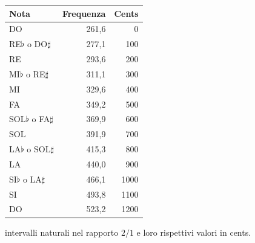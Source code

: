 \begin{center}
\renewcommand{\arraystretch}{1.1}
\begin{tabular}{lrr}
  \toprule
  \textbf{Nota} & \textbf{Frequenza} & \textbf{Cents} \\
  \midrule
  DO                       & 261,6 & 0 \\
  RE$\flat$ o DO$\sharp$   & 277,1 & 100 \\
  RE                       & 293,6 & 200 \\
  MI$\flat$ o RE$\sharp$   & 311,1 & 300 \\
  MI                       & 329,6 & 400 \\
  FA                       & 349,2 & 500 \\
  SOL$\flat$ o FA$\sharp$  & 369,9 & 600 \\
  SOL                      & 391,9 & 700 \\
  LA$\flat$ o SOL$\sharp$  & 415,3 & 800 \\
  LA                       & 440,0 & 900 \\
  SI$\flat$ o LA$\sharp$   & 466,1 & 1000 \\
  SI                       & 493,8 & 1100 \\
  DO                       & 523,2 & 1200 \\
  \bottomrule
\end{tabular}
\end{center}


 intervalli naturali nel rapporto $2/1$ e loro rispettivi valori
in cents.

